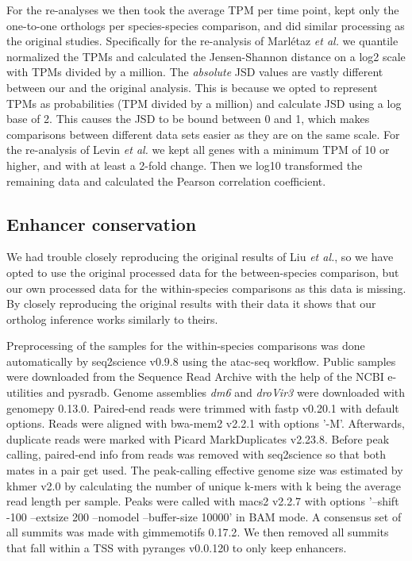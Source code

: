 For the re-analyses we then took the average TPM per time point, kept only the one-to-one orthologs per species-species comparison, and did similar processing as the original studies. Specifically for the re-analysis of Marl\'etaz \textit{et al.} we quantile normalized\cite{qnorm} the TPMs and calculated the Jensen-Shannon distance on a log2 scale with TPMs divided by a million. The \textit{absolute} JSD values are vastly different between our and the original analysis. This is because we opted to represent TPMs as probabilities (TPM divided by a million) and calculate JSD using a log base of 2. This causes the JSD to be bound between 0 and 1, which makes comparisons between different data sets easier as they are on the same scale. For the re-analysis of Levin \textit{et al.} we kept all genes with a minimum TPM of 10 or higher, and with at least a 2-fold change. Then we log10 transformed the remaining data and calculated the Pearson correlation coefficient.

\subsection{Enhancer conservation}

We had trouble closely reproducing the original results of Liu \textit{et al.}, so we have opted to use the original processed data for the between-species comparison, but our own processed data for the within-species comparisons as this data is missing. By closely reproducing the original results with their data it shows that our ortholog inference works similarly to theirs.

Preprocessing of the samples for the within-species comparisons was done automatically by seq2science v0.9.8\cite{seq2science} using the atac-seq workflow. Public samples were downloaded from the Sequence Read Archive with the help of the NCBI e-utilities and pysradb\cite{Choudhary2019}. Genome assemblies \textit{dm6} and \textit{droVir3} were downloaded with genomepy 0.13.0\cite{Frlich2023}. Paired-end reads were trimmed with fastp v0.20.1\cite{Chen2018} with default options. Reads were aligned with bwa-mem2 v2.2.1\cite{bwamem2} with options '-M'. Afterwards, duplicate reads were marked with Picard MarkDuplicates v2.23.8\cite{picard}. Before peak calling, paired-end info from reads was removed with seq2science so that both mates in a pair get used. The peak-calling effective genome size was estimated by khmer v2.0\cite{Crusoe2015} by calculating the number of unique k-mers with k being the average read length per sample. Peaks were called with macs2 v2.2.7\cite{Zhang2008} with options '--shift -100 --extsize 200 --nomodel --buffer-size 10000' in BAM mode. A consensus set of all summits was made with gimmemotifs 0.17.2\cite{Bruse_2018}. We then removed all summits that fall within a TSS with pyranges v0.0.120\cite{Stovner2019} to only keep enhancers.

